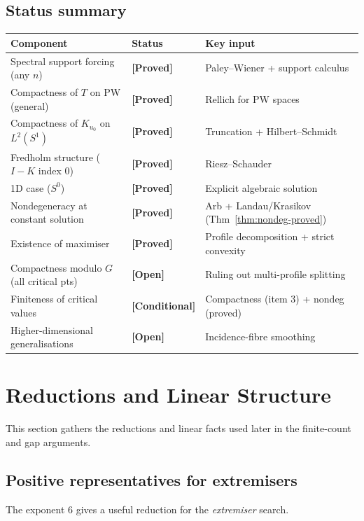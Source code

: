 \documentclass[12pt]{article}
\theoremstyle{definition}
\theoremstyle{remark}
\newcommand{\PW}{\mathrm{PW}}
\newcommand{\proven}{\textbf{\color{teal}[Proved]}}
\newcommand{\conditional}{\textbf{\color{orange}[Conditional]}}
\newcommand{\open}{\textbf{\color{red}[Open]}}
\begin{document}
\subsection{Status summary}
\renewcommand{\arraystretch}{1.4}
\begin{center}
\begin{tabular}{lll}
\hline
\textbf{Component} & \textbf{Status} & \textbf{Key input} \\
\hline
Spectral support forcing (any $n$) &
  \proven & Paley--Wiener + support calculus \\
Compactness of $T$ on $\PW$ (general) &
  \proven & Rellich for PW spaces \\
Compactness of $K_{u_0}$ on $L^2(S^1)$ &
  \proven & Truncation + Hilbert--Schmidt \\
Fredholm structure ($I-K$ index 0) &
  \proven & Riesz--Schauder \\
1D case ($S^0$) & \proven & Explicit algebraic solution \\
Nondegeneracy at constant solution &
  \proven & Arb + Landau/Krasikov (Thm~\ref{thm:nondeg-proved}) \\
Existence of maximiser &
  \proven & Profile decomposition + strict convexity \\
Compactness modulo $G$ (all critical pts) &
  \open & Ruling out multi-profile splitting \\
Finiteness of critical values &
  \conditional & Compactness (item 3) + nondeg (proved) \\
Higher-dimensional generalisations &
  \open & Incidence-fibre smoothing \\
\hline
\end{tabular}
\end{center}



\section{Reductions and Linear Structure}
\label{sec:reductions-linear}

This section gathers the reductions and linear facts used later in the
finite-count and gap arguments.

\subsection{Positive representatives for extremisers}

The exponent $6$ gives a useful reduction for the \emph{extremiser}
search.
\end{document}
